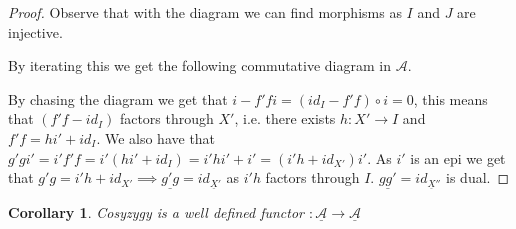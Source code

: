 \documentclass[12pt]{article}
\newtheorem{corollary}{Corollary}[theorem]
\theoremstyle{definition}
\theoremstyle{remark}
\begin{document}
            \begin{proof}
                Observe that with the diagram we can find morphisms as $I$ and $J$ are injective.
                \begin{center}
                \end{center}
                By iterating this we get the following commutative diagram in $\mathcal{A}$.
                \begin{center}
                \end{center}
                By chasing the diagram we get that $i-f'fi=(id_I-f'f)\circ i = 0$, this means that $(f'f-id_I)$ factors through $X'$, i.e. there exists $h:X'\rightarrow I$ and $f'f = hi'+id_I$. We also have that $g'gi' = i'f'f = i'(hi' +id_I) = i'hi' + i' = (i'h+id_{X'})i'$. As $i'$ is an epi we get that $g'g = i'h + id_{X'} \implies \underline{g'g}=id_{\underline{X}'}$ as $i'h$ factors through $I$. $\underline{gg'}=id_{\underline{X}''}$ is dual.
            \end{proof}

            \begin{corollary}
                Cosyzygy is a well defined functor $:\underline{\mathcal{A}}\rightarrow\underline{\mathcal{A}}$
            \end{corollary}
\end{document}
